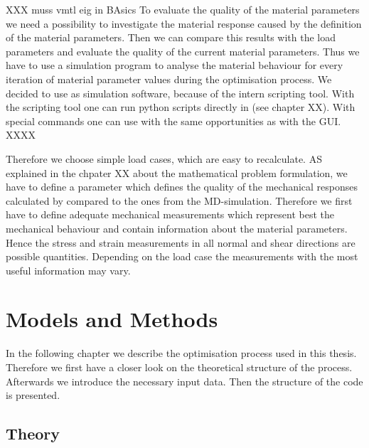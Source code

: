 
    XXX muss vmtl eig in BAsics
    To evaluate the quality of the material parameters we need a possibility to investigate the material response caused by the definition of the material parameters. Then we can compare this results with the load parameters and evaluate the quality of the current material parameters. Thus we have to use a simulation program to analyse the material behaviour for every iteration of material parameter values during the optimisation process. We decided to use  as simulation software, because of the intern scripting tool. With the  scripting tool one can run python scripts directly in  (see chapter XX). With special  commands one can use  with the same opportunities as with the GUI. 
    XXXX

    Therefore we choose simple load cases, which are easy to recalculate. AS explained in the chpater XX about the mathematical problem formulation, we have to define a parameter which defines the quality of the mechanical responses calculated by  compared to the ones from the MD-simulation. Therefore we first have to define adequate mechanical measurements which represent best the mechanical behaviour and contain information about the material parameters. Hence the stress and strain measurements in all normal and shear directions are possible quantities. Depending on the load case the measurements with the most useful information may vary.
    

    
    \chapter{Models and Methods}

    In the following chapter we describe the optimisation process used in this thesis. Therefore we first have a closer look on the theoretical structure of the process. Afterwards we introduce the necessary input data. Then the structure of the code is presented. 

    \section{Theory} \label{sec: methodTheory}

